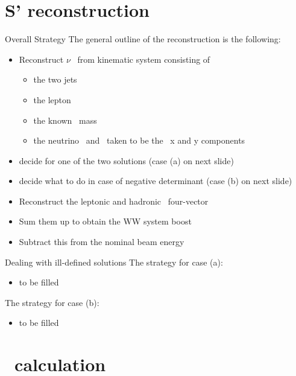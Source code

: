 \documentclass{beamer}
\newcommand{\texncmdpath}{../analysis/tex/tex_ex/newcommands}
\begin{document}
\section{S' reconstruction}


\begin{frame}{Overall Strategy}
The general outline of the reconstruction is the following:
\begin{itemize}
\item Reconstruct $\nu$ \pz\ from kinematic system consisting of
  \begin{itemize}
  \item the two jets
  \item the lepton
  \item the known \Wboson\ mass
  \item the neutrino \px\ and \py\ taken to be the \met\ x and y components
  \end{itemize}
\item decide for one of the two solutions (case (a) on next slide)
\item decide what to do in case of negative determinant (case (b) on next slide)
\item Reconstruct the leptonic and hadronic \Wboson\ four-vector
\item Sum them up to obtain the WW system boost
\item Subtract this from the nominal beam energy
\end{itemize}
\end{frame}


\begin{frame}{Dealing with ill-defined solutions}
The strategy for case (a):
\begin{itemize}
\item to be filled
\end{itemize}
The strategy for case (b):
\begin{itemize}
\item to be filled
\end{itemize}
\end{frame}







\section{\Xsec\ calculation}





\end{document}
